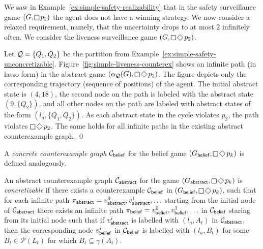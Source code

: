 \begin{example}\label{ex:simple-liveness-counterex}
We saw in Example~\ref{ex:simple-safety-realizability} that in the safety surveillance game $(G,\LTLglobally p_2)$ the agent does not have a winning strategy. %
We now consider a relaxed requirement, namely, that the uncertainty drops to at most $2$ infinitely often. We consider the liveness surveillance game 
$(G,\LTLglobally \LTLfinally p_2)$.

Let $\mathcal{Q} = \{Q_1,Q_2\}$ be the partition from Example~\ref{ex:simple-safety-unconcretizable}. %
Figure~\ref{fig:simple-liveness-counterex} shows an infinite path (in lasso form) in the abstract game $(\alpha_\part(G),\LTLglobally \LTLfinally p_2)$.  The figure depicts only the corresponding trajectory (sequence of positions) of the agent. The initial abstract state is $(4,18)$, the second node on the path is labeled with the abstract state $(9,\{Q_2\})$, and all other nodes on the path are labeled with abstract states of the form $(l_a,\{Q_1,Q_2\})$. As each abstract state in the cycle violates $p_2$, the path violates $\LTLglobally \LTLfinally p_2$. The same holds for all infinite paths in the existing abstract counterexample graph.
\qed
\end{example}

A \emph{concrete counterexample graph} $\mathcal{C}_{\mathsf{belief}}$ for the belief game $(G_\belief,\LTLglobally\LTLfinally p_k)$ is defined analogously. 

An abstract counterexample graph $\mathcal{C}_{\mathsf{abstract}}$ for the game $(G_\abstr,\LTLglobally\LTLfinally p_k)$ is \emph{concretizable} if there exists a counterexample
$\mathcal{C}_{\mathsf{belief}}$ in $(G_\belief,\LTLglobally \LTLfinally p_k)$, such that for each infinite path $\pi_{\mathsf{abstract}} = v_{\mathsf{abstract}}^0,v_{\mathsf{abstract}}^1,\ldots$ starting from the initial node of $\mathcal{C}_{\mathsf{abstract}}$ there exists an infinite path $\pi_{\mathsf{belief}} = v_{\mathsf{belief}}^0,v_{\mathsf{belief}}^1,\ldots$ in $\mathcal{C}_{\mathsf{belief}}$ staring from its initial node such that if $v_{\mathsf{abstract}}^i$ is labelled with $(l_a,A_t)$ in $\mathcal{C}_{\mathsf{abstract}}$, then the corresponding node $v_{\mathsf{belief}}^i$ in $\mathcal{C}_{\mathsf{belief}}$ is labelled with $(l_a,B_t)$ for some $B_t \in \mathcal{P}(L_t)$ for which $B_t \subseteq \gamma(A_t)$.

